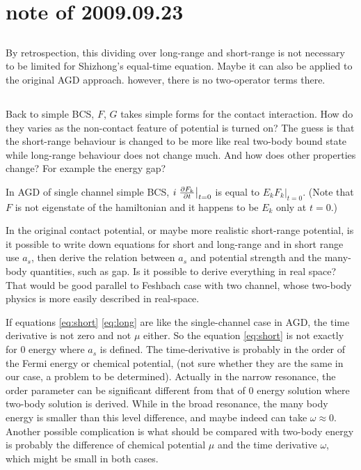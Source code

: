 \section{note of 2009.09.23}
\subsection{}
By retrospection, this dividing over long-range and short-range is not necessary to be limited for Shizhong's equal-time equation. Maybe it can also be applied to the original AGD approach.  however, there is no two-operator terms there.  	

\subsection{}
Back to simple BCS, $F$, $G$ takes simple forms for the contact interaction.  How do they varies as the non-contact feature of potential is turned on?  The guess is that the short-range behaviour is changed to be more like real two-body bound state while long-range behaviour does not change much.  And how does other properties change?  For example the energy gap?  

In AGD of single channel simple BCS, $i\left.\frac{\partial{F_k}}{\partial{t}}\right\vert_{t=0}$ is equal to $E_kF_k\vert_{t=0}$. (Note that $F$ is not eigenstate of the hamiltonian and it happens to be $E_k$ only at $t=0$.)

In the original contact potential, or maybe more realistic short-range potential, is it possible to write down equations for short and long-range and in short range use $a_s$, then derive the relation between $a_s$ and potential strength and the many-body quantities, such as gap.  Is it possible to derive everything in real space?  That would be good parallel to Feshbach case with two channel, whose two-body physics is more easily described in real-space.  

If equations \eqref{eq:short} \eqref{eq:long} are like the single-channel case in AGD, the time derivative is not zero and not $\mu$ either.  So the equation \eqref{eq:short} is not exactly for 0 energy where $a_s$ is defined. The time-derivative is probably in the order of the Fermi energy or chemical potential, (not sure whether they are the same in our case, a problem to be determined).   Actually in the narrow resonance, the order parameter can be significant different from that of 0 energy solution where two-body solution is derived.  While in the broad resonance,  the many body energy is smaller than this level difference, and maybe indeed can take $\omega\approx0$. Another possible complication is what should be compared with two-body energy is probably the difference of chemical potential $\mu$ and the time derivative $\omega$, which might be small in both cases.  

